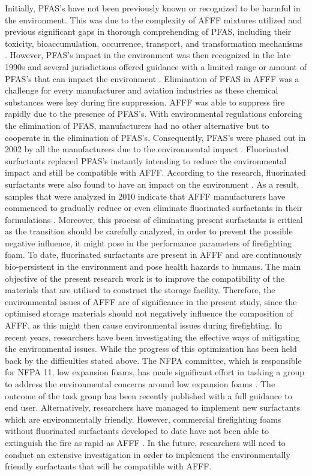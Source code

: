 \documentclass[12pt]{report}
\begin{document}
Initially, PFAS's have not been previously known or recognized to be harmful in the environment. This was due to the complexity of AFFF mixtures utilized and previous significant gaps in thorough comprehending of PFAS, including their toxicity, bioaccumulation, occurrence, transport, and transformation mechanisms \cite{milley2018estimating}. However, PFAS's impact in the environment was then recognized in the late 1990s and several jurisdictions offered guidance with a limited range or amount of PFAS's that can impact the environment \cite{hinnant2017influence}.
Elimination of PFAS in AFFF was a challenge for every manufacturer and aviation industries as these chemical substances were key during fire suppression. AFFF was able to suppress fire rapidly due to the presence of PFAS's. With environmental regulations enforcing the elimination of PFAS, manufacturers had no other alternative but to cooperate in the elimination of PFAS's. Consequently, PFAS's were phased out in 2002 by all the manufacturers due to the environmental impact \cite{persson2003foamspex}.  Fluorinated surfactants replaced PFAS's instantly intending to reduce the environmental impact and still be compatible with AFFF. 
According to the research, fluorinated surfactants were also found to have an impact on the environment \cite{martin2012fire}. As a result, samples that were analyzed in 2010 indicate that AFFF manufacturers have commenced to gradually reduce or even eliminate fluorinated surfactants in their formulations \cite{milley2018estimating}. Moreover, this process of eliminating present surfactants is critical as the transition should be carefully analyzed, in order to prevent the possible negative influence, it might pose in the performance parameters of firefighting foam. To date, fluorinated surfactants are present in AFFF and are continuously bio-persistent in the environment and pose health hazards to humans.
The main objective of the present research work is to improve the compatibility of the materials that are utilised to construct the storage facility. Therefore, the environmental issues of AFFF are of significance in the present study, since the optimised storage materials should not negatively influence the composition of AFFF, as this might then cause environmental issues during firefighting. 
In recent years, researchers have been investigating the effective ways of mitigating the environmental issues. While the progress of this optimization has been held back by the difficulties stated above. The NFPA committee, which is responsible for NFPA 11, low expansion foams, has made significant effort in tasking a group to address the environmental concerns around low expansion foams \cite{scheffey1995evaluating}. The outcome of the task group has been recently published with a full guidance to end user\cite{scheffey1995evaluating}. Alternatively, researchers have managed to implement new surfactants which are environmentally friendly. However, commercial firefighting foams without fluorinated surfactants developed to date have not been able to extinguish the fire as rapid as AFFF \cite{hinnant2017influence}. In the future, researchers will need to conduct an extensive investigation in order to implement the environmentally friendly surfactants that will be compatible with AFFF.  
\end{document}
